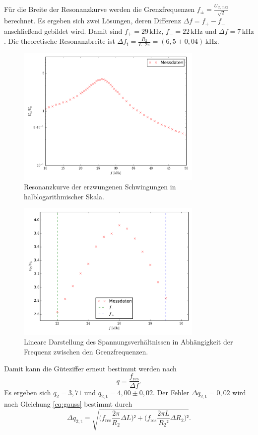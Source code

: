 Für die Breite der Resonanzkurve werden die Grenzfrequenzen $f_\pm=\frac{U_\mathup{C,max}}{\sqrt{2}}$ berechnet. Es ergeben sich zwei Lösungen, deren Differenz $\Delta{f}=f_+-f_-$ anschließend gebildet wird. 
Damit sind $f_+=29\,\si{\kilo\hertz}$, $f_-=22\,\si{\kilo\hertz}$ und $\Delta{f}=7\,\si{\kilo\hertz}$. 
Die theoretische Resonanzbreite ist $\Delta{f_\mathup{t}}=\frac{R_2}{L\cdot2\pi}=(6,5\pm0,04)\,\si{\kilo\hertz}$. 
\begin{figure}[h]
		\centering
		\includegraphics[width=0.8\textwidth]{build/plot_amplitude_semilog.pdf}
		\caption{Resonanzkurve der erzwungenen Schwingungen in halblogarithmischer Skala.\cite{matplotlib}}
\end{figure}
\begin{figure}[h]
		\centering
		\includegraphics[width=0.8\textwidth]{build/plot_amplitude_linear.pdf}
		\caption{Lineare Darstellung des Spannungsverhältnissen in Abhängigkeit der Frequenz zwischen den Grenzfrequenzen.\cite{matplotlib}}
\end{figure}
Damit kann die Güteziffer erneut bestimmt werden nach 
\begin{equation}
q=\frac{f_\mathup{res}}{\Delta{f}}.
\label{eq:formel}
\end{equation}
 Es ergeben sich $q_2=3,71$ und $q_{2,\mathup{t}}=4,00\pm0,02$. Der Fehler $\Delta{q_{2,\mathup{t}}}=0,02$ wird nach Gleichung \eqref{eq:gauss}  bestimmt durch
\begin{equation}
\Delta{q_{2,\mathup{t}}}=\sqrt{\biggl(f_\mathup{res}\frac{2\pi}{R_2}\Delta{L}\biggr)²+\biggl(f_\mathup{res}\frac{2\pi L}{{R_2}²}\Delta{R_2}\biggr)²}.
\end{equation}

